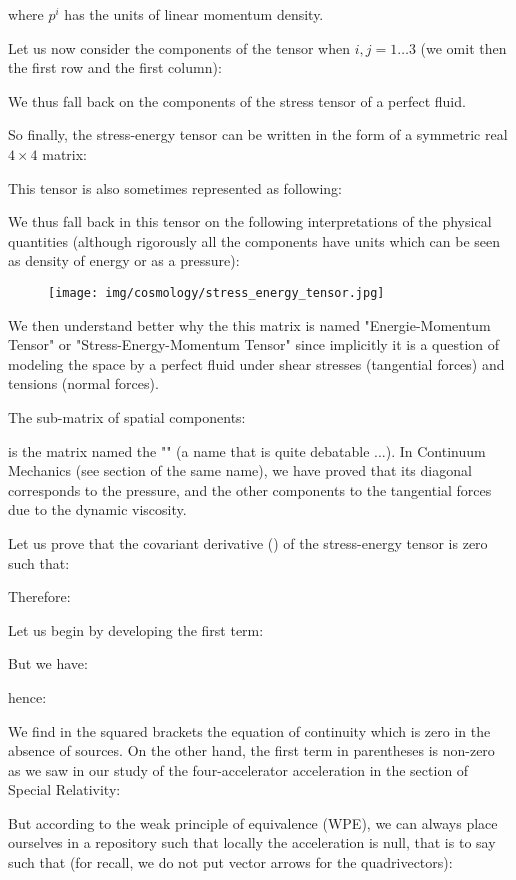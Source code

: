 	where $p^i$ has the units of linear momentum density.

	Let us now consider the components of the tensor when $i,j=1\ldots 3$ (we omit then the first row and the first column):
	
	We thus fall back on the components of the stress tensor of a perfect fluid.

	So finally, the stress-energy tensor can be written in the form of a symmetric real $4\times 4$ matrix:
	
	
	This tensor is also sometimes represented as following:
	
	We thus fall back in this tensor on the following interpretations of the physical quantities (although rigorously all the components have units which can be seen as density of energy or as a pressure):
	\begin{figure}[H]
		\centering
		\texttt{[image: img/cosmology/stress\_energy\_tensor.jpg]}	
	\end{figure}
	We then understand better why the this matrix is named "Energie-Momentum Tensor" or "Stress-Energy-Momentum Tensor" since implicitly it is a question of modeling the space by a perfect fluid under shear stresses (tangential forces) and tensions (normal forces).
	\begin{tcolorbox}[title=Remark,colframe=black,arc=10pt]
	The sub-matrix of spatial components:
	
	is the matrix named the "" (a name that is quite debatable ...). In Continuum Mechanics (see section of the same name), we have proved that its diagonal corresponds to the pressure, and the other components to the tangential forces due to the dynamic viscosity.
	\end{tcolorbox}
	Let us prove that the covariant derivative () of the stress-energy tensor is zero such that:
	
	Therefore:
	
	Let us begin by developing the first term:
	
	But we have:
	
	hence:
	
	We find in the squared brackets the equation of continuity which is zero in the absence of sources. On the other hand, the first term in parentheses is non-zero as we saw in our study of the four-accelerator acceleration in the section of Special Relativity:
	
	But according to the weak principle of equivalence (WPE), we can always place ourselves in a repository such that locally the acceleration is null, that is to say such that (for recall, we do not put vector arrows for the quadrivectors):
	
